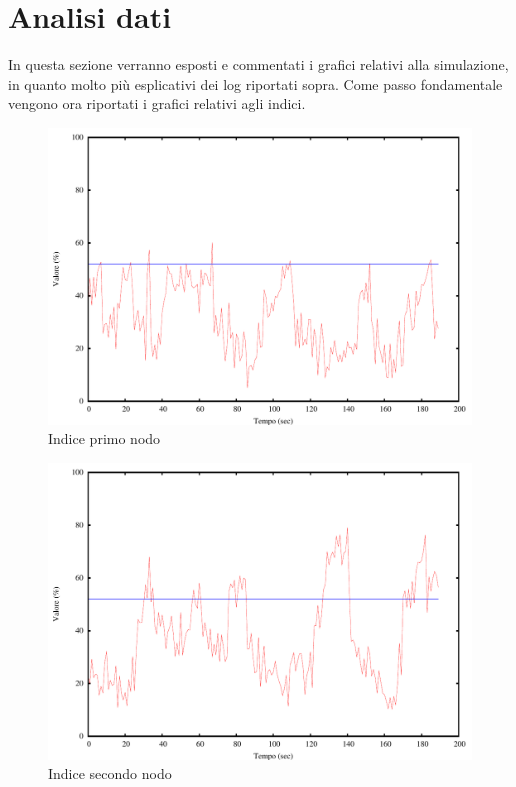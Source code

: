 \section{Analisi dati}
In questa sezione verranno esposti e commentati i grafici relativi alla simulazione, in quanto molto più esplicativi dei log riportati sopra. Come passo fondamentale vengono ora riportati i grafici relativi agli indici.
\begin{figure}[H]
\begin{center}
\includegraphics[scale=0.6]{etc/index1.pdf}
\caption{Indice primo nodo}
\label{fig:index1}
\end{center}
\end{figure}
\begin{figure}[H]
\begin{center}
\includegraphics[scale=0.6]{etc/index2.pdf}
\caption{Indice secondo nodo}
\label{fig:index2}
\end{center}
\end{figure}
